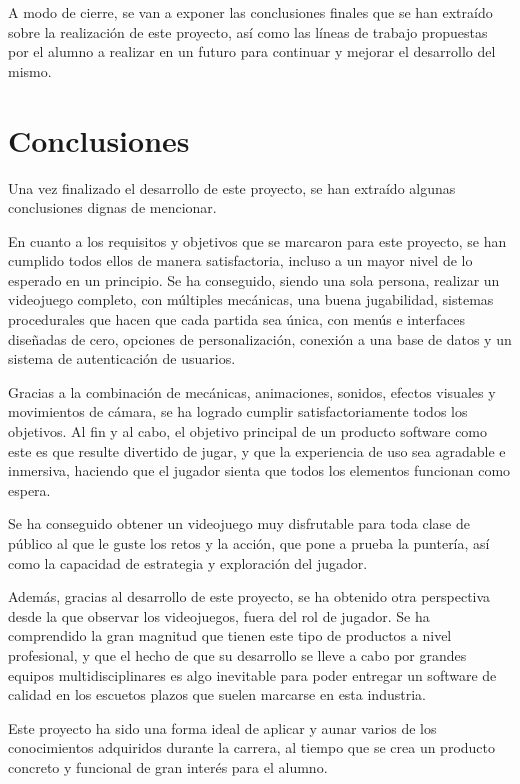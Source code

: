 
A modo de cierre, se van a exponer las conclusiones finales que se han extraído sobre la realización de este proyecto, así como las líneas de trabajo propuestas por el alumno a realizar en un futuro para continuar y mejorar el desarrollo del mismo.

\section{Conclusiones}
Una vez finalizado el desarrollo de este proyecto, se han extraído algunas conclusiones dignas de mencionar.

En cuanto a los requisitos y objetivos que se marcaron para este proyecto, se han cumplido todos ellos de manera satisfactoria, incluso a un mayor nivel de lo esperado en un principio.
Se ha conseguido, siendo una sola persona, realizar un videojuego completo, con múltiples mecánicas, una buena jugabilidad, sistemas procedurales que hacen que cada partida sea única, con menús e interfaces diseñadas de cero, opciones de personalización, conexión a una base de datos y un sistema de autenticación de usuarios.

Gracias a la combinación de mecánicas, animaciones, sonidos, efectos visuales y movimientos de cámara, se ha logrado cumplir satisfactoriamente todos los objetivos.
Al fin y al cabo, el objetivo principal de un producto software como este es que resulte divertido de jugar, y que la experiencia de uso sea agradable e inmersiva, haciendo que el jugador sienta que todos los elementos funcionan como espera.

Se ha conseguido obtener un videojuego muy disfrutable para toda clase de público al que le guste los retos y la acción, que pone a prueba la puntería, así como la capacidad de estrategia y exploración del jugador.

Además, gracias al desarrollo de este proyecto, se ha obtenido otra perspectiva desde la que observar los videojuegos, fuera del rol de jugador. Se ha comprendido la gran magnitud que tienen este tipo de productos a nivel profesional, y que el hecho de que su desarrollo se lleve a cabo por grandes equipos multidisciplinares es algo inevitable para poder entregar un software de calidad en los escuetos plazos que suelen marcarse en esta industria.

Este proyecto ha sido una forma ideal de aplicar y aunar varios de los conocimientos adquiridos durante la carrera, al tiempo que se crea un producto concreto y funcional de gran interés para el alumno.

